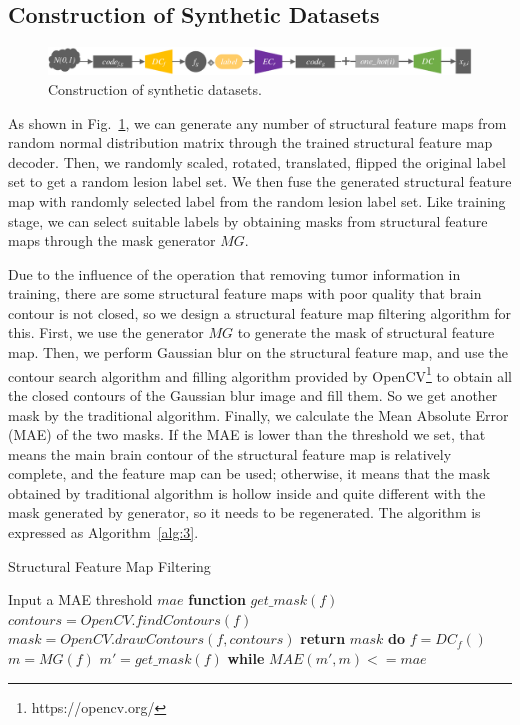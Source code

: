 \documentclass[letterpaper]{article} %
\begin{document}
\subsection{Construction of Synthetic Datasets}
\label{make dataset}
\begin{figure}
	\centering
	\includegraphics[width=0.98\columnwidth]{figures/make_data}
	\caption{Construction of synthetic datasets.}
	\label{make_data}
\end{figure}
As shown in Fig.~\ref{make_data}, we can generate any number of structural feature maps from random normal distribution matrix through the trained structural feature map decoder. Then, we randomly scaled, rotated, translated, flipped the original label set to get a random lesion label set. We then fuse the generated structural feature map with randomly selected label from the random lesion label set. Like training stage, we can select suitable labels by obtaining masks from structural feature maps through the mask generator $MG$.

Due to the influence of the operation that removing tumor information in training, there are some structural feature maps with poor quality that brain contour is not closed, so we design a structural feature map filtering algorithm for this. First, we use the generator $MG$ to generate the mask of structural feature map. Then, we perform Gaussian blur\cite{92wink2004denoising} on the structural feature map, and use the contour search algorithm and filling algorithm provided by OpenCV\footnote{https://opencv.org/} to obtain all the closed contours of the Gaussian blur image and fill them. So we get another mask by the traditional algorithm. Finally, we calculate the Mean Absolute Error (MAE) of the two masks. If the MAE is lower than the threshold we set, that means the main brain contour of the structural feature map is relatively complete, and the feature map can be used; otherwise, it means that the mask obtained by traditional algorithm is hollow inside and quite different with the mask generated by generator, so it needs to be regenerated. The algorithm is expressed as Algorithm~\ref{alg:3}.
\begin{algorithm}
	\caption{Structural Feature Map Filtering}
	\label{alg:3}
	\begin{algorithmic}[1]
		\State Input a MAE threshold $mae$
		\State \textbf{function} $get\_mask(f)$
		\State \indent$contours = OpenCV.findContours(f)$
		\State \indent$mask =OpenCV.drawContours(f,contours)$
		\State \indent\textbf{return} $mask$
		\State \textbf{do} 
		\State \indent$f = DC_f()$
		\State \indent$m = MG(f)$
		\State \indent$m'= get\_mask(f)$
		\State \textbf{while} $MAE(m',m) <= mae$
	\end{algorithmic}  
\end{algorithm}
\end{document}
